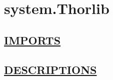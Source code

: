 \chapter*{system.Thorlib}
\hypertarget{ecldoc:toc:system.Thorlib}{}

\section*{\underline{IMPORTS}}

\section*{\underline{DESCRIPTIONS}}
